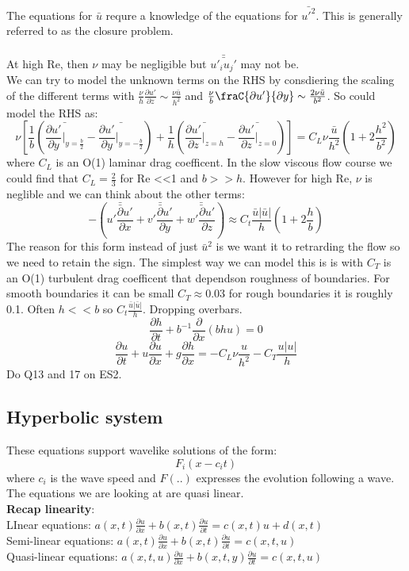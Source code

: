 \documentclass{article}
\begin{document}
     The equations for $\bar u$ requre a knowledge of the equations for $\bar{u'^2}$. This is generally referred to as the closure problem.\\\\
     At high Re, then $\nu$ may be negligible but $\bar{\bar{u'_i u_j'}}$ may not be.\\
     We can try to model the unknown terms on the RHS by consdiering the scaling of the different terms with $\frac{\nu}{h} \frac{\partial u'}{\partial z} \sim \frac{\nu \bar u}{h^2}$ and $\frac{\nu}{b} \fraC{\partial u'}{\partial y} \sim \frac{2\nu \bar u}{b^2}$. So could model the RHS as:
     $$
     \nu[ \frac{1}{b} ( \bar{\frac{\partial u'}{\partial y}|_{y = \frac{b}{2}}} - \bar{\frac{\partial u'}{\partial y} |_{y=- \frac{b}{2}}}) + \frac{1}{h} ( \bar{ \frac{\partial u'}{\partial z}|_{z=h} } - \bar{ \frac{\partial u'}{\partial z}|_{z=0}} )] = C_L \nu \frac{\bar u}{h^2} (1 + 2 \frac{h^2}{b^2})
     $$
     where $C_L$ is an O(1) laminar drag coefficent. In the slow viscous flow course we could find that $C_L= \frac{2}{3}$ for Re <<1 and $b>>h$. However for high Re, $\nu$ is neglible and we can think about the other terms:
     $$
     - ( \bar{\bar{ u' \frac{\partial u'}{\partial x}}} + \bar{\bar{ v' \frac{\partial u'}{\partial y}}} + \bar{\bar{w' \frac{\partial u'}{\partial z}}}) \approx C_t \frac{\bar u | \bar u|}{h} ( 1+ 2 \frac{h}{b})
     $$
     The reason for this form instead of just $\bar u^2$ is we want it to retrarding the flow so we need to retain the sign. The simplest way we can model this is is with $C_T$ is an O(1) turbulent drag coefficent that dependson roughness of boundaries. For smooth boundaries it can be small $ C_T \approx 0.03$ for rough boundaries it is roughly 0.1. Often $h << b$ so $C_t \frac{\bar u |\bar u|}{h}$. Dropping overbars.
     $$
      \frac{\partial h}{\partial t} + b^{-1} \frac{\partial}{\partial x} ( bhu) = 0
     $$
     $$
      \frac{\partial u}{\partial t} + u \frac{\partial u}{\partial x} + g \frac{\partial h}{\partial x} = - C_L \nu \frac{u}{h^2} - C_T \frac{u |u|}{h}
     $$
     Do Q13 and 17  on ES2.\\
     \subsection{Hyperbolic system}
     These equations support wavelike solutions of the form: 
     $$
     F_i(x-c_it)
     $$
     where $c_i$ is the wave speed and $F(..)$ expresses the evolution following a wave. The equations we are looking at are quasi linear.\\
     \textbf{Recap linearity}:\\ LInear equations: $a(x,t) \frac{\partial u}{\partial x} + b (x,t) \frac{\partial u}{\partial t} = c(x,t) u + d(x,t)$\\
     Semi-linear equations: $ a(x,t) \frac{\partial u}{\partial x} + b(x,t) \frac{\partial u}{\partial t} = c(x,t,u)$\\
      Quasi-linear equations: $a(x,t,u) \frac{\partial u}{\partial x} + b(x,t,y) \frac{\partial u}{\partial t} = c(x,t,u)$
\end{document}
